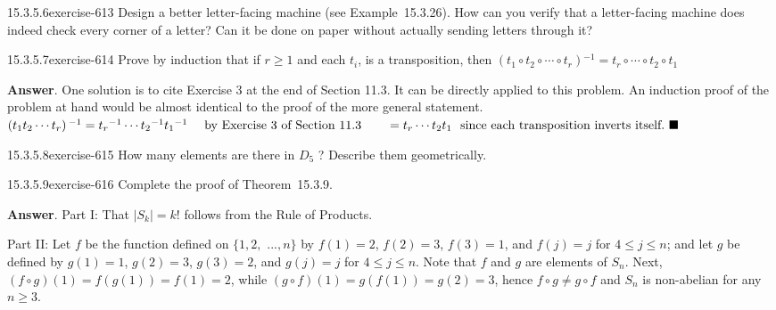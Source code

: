 \documentclass[twoside,10pt,]{book}
\numberwithin{equation}{section}
\begin{document}
\begin{divisionsolution}{15.3.5.6}{}{exercise-613}%
\hypertarget{p-5510}{}%
Design a better letter-facing machine (see Example~15.3.26). How can you verify that a letter-facing machine does indeed check every corner of a letter? Can it be done on paper without actually sending letters through it?%
\end{divisionsolution}%
\begin{divisionsolution}{15.3.5.7}{}{exercise-614}%
\hypertarget{p-5511}{}%
Prove by induction that if \(r \geq  1\) and each \(t_i\), is a transposition, then  \(\left(t_1\circ t_2\circ \cdots \circ t_r\right){}^{-1}=t_r\circ \cdots \circ t_2\circ t_1\)%
\par\smallskip%
\noindent\textbf{Answer}.\quad%
\hypertarget{p-5512}{}%
One solution is to cite Exercise 3 at the end of Section 11.3. It can be directly applied to this problem. An induction proof of the problem at hand would be almost identical to the proof of the more general statement. \(\left(t_1t_2\cdots  t_r\right){}^{-1}= t_r{}^{-1}\cdots  t_2{}^{-1}t_1{}^{-1}\quad\textrm{ by Exercise 3 of  Section 11.3}\\
\\
\quad \quad = t_r\cdots  t_2t_1\textrm{                }\textrm{ since} \textrm{ each} \textrm{ transposition} \textrm{ inverts} \textrm{ itself}.\textrm{     }\blacksquare\)%
\end{divisionsolution}%
\begin{divisionsolution}{15.3.5.8}{}{exercise-615}%
\hypertarget{p-5513}{}%
How many elements are there in \(D_5\) ? Describe them geometrically.%
\end{divisionsolution}%
\begin{divisionsolution}{15.3.5.9}{}{exercise-616}%
\hypertarget{p-5514}{}%
Complete the proof of Theorem~15.3.9.%
\par\smallskip%
\noindent\textbf{Answer}.\quad%
\hypertarget{p-5515}{}%
Part I: That \(\lvert S_k \rvert  = k!\) follows from the Rule of Products.%
\par
\hypertarget{p-5516}{}%
Part II: Let  \(f\)  be the function defined on \(\{1,2,\textrm{ ...}, n\}\) by \(f(1)=2\), \(f(2)=3\),  \(f(3)=1\), and \(f(j) =j\)  for \(4\leq j\leq n\); and let \(g\) be defined by \(g(1) = 1\), \(g(2) = 3\), \(g(3) = 2\), and \(g(j) =j\)  for \(4\leq j\leq n\).  Note that \(f\) and \(g\) are elements of \(S_n\). Next, \((f\circ g)(1) = f(g(1)) = f(1) = 2\), while \((g \circ f)(1) = g(f(1)) = g(2) =
3\), hence  \(f\circ g\neq g\circ f\) and \(S_n\) is non-abelian for any \(n \geq  3\).%
\end{divisionsolution}%
\end{document}
